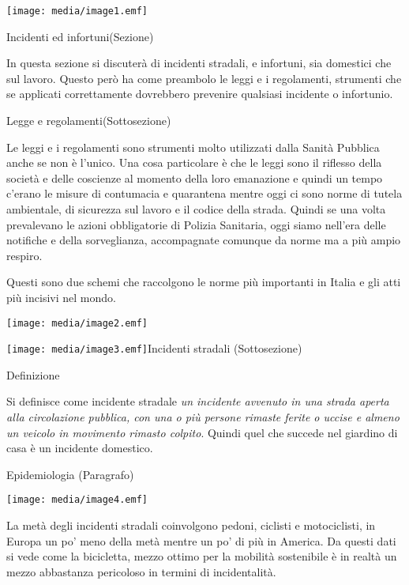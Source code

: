 \documentclass[]{article}
\begin{document}
\texttt{[image: media/image1.emf]}

Incidenti ed infortuni(Sezione)

In questa sezione si discuterà di incidenti stradali, e infortuni, sia
domestici che sul lavoro. Questo però ha come preambolo le leggi e i
regolamenti, strumenti che se applicati correttamente dovrebbero
prevenire qualsiasi incidente o infortunio.

Legge e regolamenti(Sottosezione)

Le leggi e i regolamenti sono strumenti molto utilizzati dalla Sanità
Pubblica anche se non è l'unico. Una cosa particolare è che le leggi
sono il riflesso della società e delle coscienze al momento della loro
emanazione e quindi un tempo c'erano le misure di contumacia e
quarantena mentre oggi ci sono norme di tutela ambientale, di sicurezza
sul lavoro e il codice della strada. Quindi se una volta prevalevano le
azioni obbligatorie di Polizia Sanitaria, oggi siamo nell'era delle
notifiche e della sorveglianza, accompagnate comunque da norme ma a più
ampio respiro.

Questi sono due schemi che raccolgono le norme più importanti in Italia
e gli atti più incisivi nel mondo.

\texttt{[image: media/image2.emf]}

\texttt{[image: media/image3.emf]}Incidenti
stradali (Sottosezione)

Definizione

Si definisce come incidente stradale \emph{un incidente avvenuto in una
strada aperta alla circolazione pubblica, con una o più persone rimaste
ferite o uccise e almeno un veicolo in movimento rimasto colpito}.
Quindi quel che succede nel giardino di casa è un incidente domestico.

Epidemiologia (Paragrafo)

\texttt{[image: media/image4.emf]}

La metà degli incidenti stradali coinvolgono pedoni, ciclisti e
motociclisti, in Europa un po' meno della metà mentre un po' di più in
America. Da questi dati si vede come la bicicletta, mezzo ottimo per la
mobilità sostenibile è in realtà un mezzo abbastanza pericoloso in
termini di incidentalità.
\end{document}
